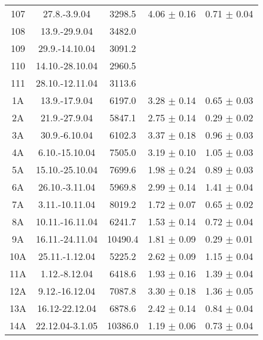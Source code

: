 \documentclass[a4paper,12pt]{article}
\begin{document}
\begin{center}
\begin{longtable}{|c|c|c|c|c|}
    107 &       27.8.-3.9.04    &       3298.5  &       4.06 $\pm$ 0.16 &       0.71 $\pm$ 0.04 \\
    108 &       13.9.-29.9.04   &       3482.0  &                       &                       \\
    109 &       29.9.-14.10.04  &       3091.2  &                       &                       \\
    110 &       14.10.-28.10.04 &       2960.5  &                       &                       \\
    111 &       28.10.-12.11.04 &       3113.6  &                       &                       \\
    1A  &       13.9.-17.9.04   &       6197.0  &       3.28 $\pm$ 0.14 &       0.65 $\pm$ 0.03 \\
    2A  &       21.9.-27.9.04   &       5847.1  &       2.75 $\pm$ 0.14 &       0.29 $\pm$ 0.02 \\
    3A  &       30.9.-6.10.04   &       6102.3  &       3.37 $\pm$ 0.18 &       0.96 $\pm$ 0.03 \\
    4A  &       6.10.-15.10.04  &       7505.0  &       3.19 $\pm$ 0.10 &       1.05 $\pm$ 0.03 \\
    5A  &       15.10.-25.10.04 &       7699.6  &       1.98 $\pm$ 0.24 &       0.89 $\pm$ 0.03 \\
    6A  &       26.10.-3.11.04  &       5969.8  &       2.99 $\pm$ 0.14 &       1.41 $\pm$ 0.04 \\
    7A  &       3.11.-10.11.04  &       8019.2  &       1.72 $\pm$ 0.07 &       0.65 $\pm$ 0.02 \\
    8A  &       10.11.-16.11.04 &       6241.7  &       1.53 $\pm$ 0.14 &       0.72 $\pm$ 0.04 \\
    9A  &       16.11.-24.11.04 &       10490.4 &       1.81 $\pm$ 0.09 &       0.29 $\pm$ 0.01 \\
    10A &       25.11.-1.12.04  &       5225.2  &       2.62 $\pm$ 0.09 &       1.15 $\pm$ 0.04 \\
    11A &       1.12.-8.12.04   &       6418.6  &       1.93 $\pm$ 0.16 &       1.39 $\pm$ 0.04 \\
    12A &       9.12.-16.12.04  &       7087.8  &       3.30 $\pm$ 0.18 &       1.36 $\pm$ 0.05 \\
    13A &       16.12-22.12.04  &       6878.6  &       2.42 $\pm$ 0.14 &       0.84 $\pm$ 0.04 \\
    14A &       22.12.04-3.1.05 &       10386.0 &       1.19 $\pm$ 0.06 &       0.73 $\pm$ 0.04 \\

\end{longtable}
\end{center}
\end{document}
